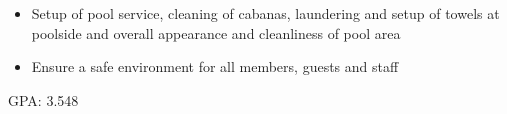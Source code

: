 \documentclass[10pt,letter,ragged2e,withhyper]{altacv}
\begin{document}
\begin{paracol}{2}
\divider

\begin{itemize}
\item Setup of pool service, cleaning of cabanas, laundering and setup of towels at poolside and overall appearance and cleanliness of pool area
\item Ensure a safe environment for all members, guests and staff
\end{itemize}










\switchcolumn


GPA: 3.548

\divider




\end{paracol}
\end{document}
